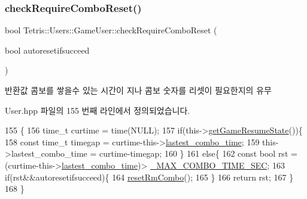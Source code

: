 \subsubsection{\texorpdfstring{check\+Require\+Combo\+Reset()}{checkRequireComboReset()}}
{\footnotesize\ttfamily bool Tetris\+::\+Users\+::\+Game\+User\+::check\+Require\+Combo\+Reset (\begin{DoxyParamCaption}\item[{bool}]{autoresetifsucceed }\end{DoxyParamCaption})\hspace{0.3cm}{\ttfamily [inline]}}

\begin{DoxyReturn}{반환값}
콤보를 쌓을수 있는 시간이 지나 콤보 숫자를 리셋이 필요한지의 유무 
\end{DoxyReturn}


User.\+hpp 파일의 155 번째 라인에서 정의되었습니다.


\begin{DoxyCode}
155                                                                 \{
156                 time\_t curtime = time(NULL);
157                 \textcolor{keywordflow}{if}(this->\hyperlink{class_tetris_1_1_users_1_1_game_user_a12cc139cfa5d31708d0e53b07e110ab3}{getGameResumeState}())\{
158                     \textcolor{keyword}{const} time\_t timegap = curtime-this->\hyperlink{class_tetris_1_1_users_1_1_game_user_a1268a4608b581740139e81b2324c9166}{lastest\_combo\_time};
159                     this->lastest\_combo\_time = curtime-timegap;
160                 \}
161                 \textcolor{keywordflow}{else}\{
162                     \textcolor{keyword}{const} \textcolor{keywordtype}{bool} rst =(curtime-this->\hyperlink{class_tetris_1_1_users_1_1_game_user_a1268a4608b581740139e81b2324c9166}{lastest\_combo\_time})>
      \hyperlink{_user_8hpp_af8befc0feccb53f9cc0e5c2a63778d9a}{\_MAX\_COMBO\_TIME\_SEC};
163                     \textcolor{keywordflow}{if}(rst&&autoresetifsucceed)\{
164                         \hyperlink{class_tetris_1_1_users_1_1_game_user_a91a7cf9f13654b44b43ac0d2f1125206}{resetRmCombo}();
165                     \}
166                     \textcolor{keywordflow}{return} rst;
167                 \}
168             \}
\end{DoxyCode}
\mbox{\label{class_tetris_1_1_users_1_1_game_user_a5efbd1ed9fa84a4041c218fb32463c36}} 
